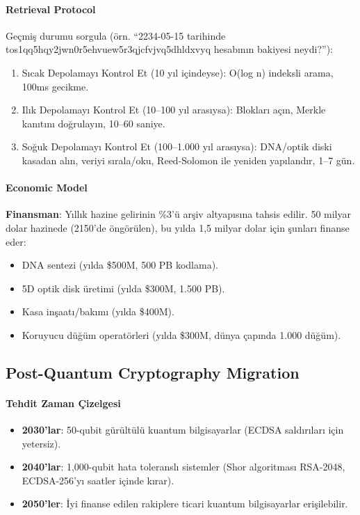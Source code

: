 \documentclass[11pt]{article}
\begin{document}
\paragraph{Retrieval Protocol}
Geçmiş durumu sorgula (örn. ``2234-05-15 tarihinde tos1qq5hqy2jwn0r5ehvuew5r3qjcfvjvq5dhldxvyq hesabının bakiyesi neydi?''):
\begin{enumerate}[noitemsep]
  \item Sıcak Depolamayı Kontrol Et (10 yıl içindeyse): O(log n) indeksli arama, 100ms gecikme.
  \item Ilık Depolamayı Kontrol Et (10--100 yıl arasıysa): Blokları açın, Merkle kanıtını doğrulayın, 10--60 saniye.
  \item Soğuk Depolamayı Kontrol Et (100--1.000 yıl arasıysa): DNA/optik diski kasadan alın, veriyi sırala/oku, Reed-Solomon ile yeniden yapılandır, 1--7 gün.
\end{enumerate}

\paragraph{Economic Model}
\textbf{Finansman}: Yıllık hazine gelirinin \%3'ü arşiv altyapısına tahsis edilir. 50 milyar dolar hazinede (2150'de öngörülen), bu yılda 1,5 milyar dolar için şunları finanse eder:
\begin{itemize}[noitemsep]
  \item DNA sentezi (yılda \$500M, 500 PB kodlama).
  \item 5D optik disk üretimi (yılda \$300M, 1.500 PB).
  \item Kasa inşaatı/bakımı (yılda \$400M).
  \item Koruyucu düğüm operatörleri (yılda \$300M, dünya çapında 1.000 düğüm).
\end{itemize}

\subsection{Post-Quantum Cryptography Migration}

\paragraph{Tehdit Zaman Çizelgesi}
\begin{itemize}[noitemsep]
  \item \textbf{2030'lar}: 50-qubit gürültülü kuantum bilgisayarlar (ECDSA saldırıları için yetersiz).
  \item \textbf{2040'lar}: 1,000-qubit hata toleranslı sistemler (Shor algoritması RSA-2048, ECDSA-256'yı saatler içinde kırar).
  \item \textbf{2050'ler}: İyi finanse edilen rakiplere ticari kuantum bilgisayarlar erişilebilir.
\end{itemize}
\end{document}
